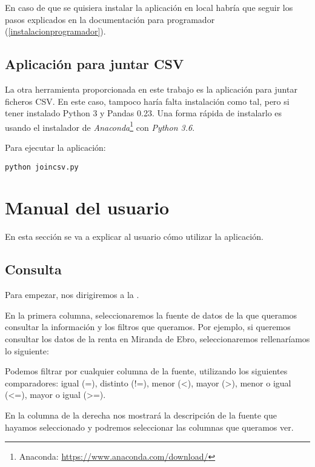 En caso de que se quisiera instalar la aplicación en local habría que seguir los pasos explicados en la documentación para programador (\ref{instalacionprogramador}). 

\subsection{Aplicación para juntar CSV}

La otra herramienta proporcionada en este trabajo es la aplicación para juntar ficheros CSV. En este caso, tampoco haría falta instalación como tal, pero si tener instalado Python 3 y Pandas 0.23. Una forma rápida de instalarlo es usando el instalador de \textit{Anaconda}\footnote{Anaconda: \href{https://www.anaconda.com/download/}{https://www.anaconda.com/download/}} con \textit{Python 3.6}.

Para ejecutar la aplicación:

\begin{lstlisting}
python joincsv.py
\end{lstlisting}

\section{Manual del usuario}

En esta sección se va a explicar al usuario cómo utilizar la aplicación.

\subsection{Consulta} \label{consulta}

Para empezar, nos dirigiremos a la .


En la primera columna, seleccionaremos la fuente de datos de la que queramos consultar la información y los filtros que queramos. Por ejemplo, si queremos consultar los datos de la renta en Miranda de Ebro, seleccionaremos rellenaríamos lo siguiente:


Podemos filtrar por cualquier columna de la fuente, utilizando los siguientes comparadores: igual (=), distinto (!=), menor (<), mayor (>), menor o igual (<=), mayor o igual (>=).

En la columna de la derecha nos mostrará la descripción de la fuente que hayamos seleccionado y podremos seleccionar las columnas que queramos ver.


